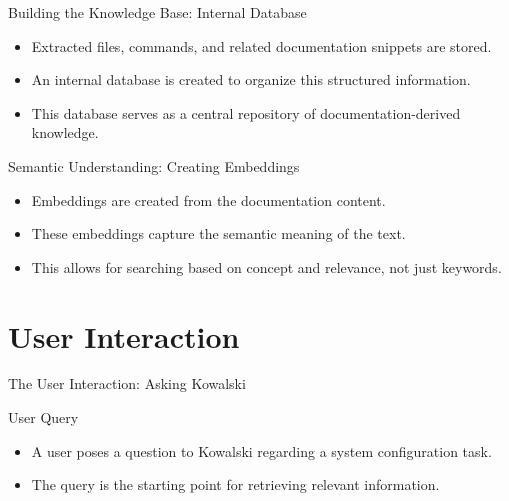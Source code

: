 \documentclass[aspectratio=169]{beamer}
\begin{document}
\begin{frame}{Building the Knowledge Base: Internal Database}
  \begin{itemize}
    \item Extracted files, commands, and related documentation snippets are stored.
    \item An internal database is created to organize this structured information.
    \item This database serves as a central repository of documentation-derived knowledge.
  \end{itemize}
\end{frame}

\begin{frame}{Semantic Understanding: Creating Embeddings}
  \begin{itemize}
    \item Embeddings are created from the documentation content.
    \item These embeddings capture the semantic meaning of the text.
    \item This allows for searching based on concept and relevance, not just keywords.
  \end{itemize}
\end{frame}

\section{User Interaction}
\begin{frame}{The User Interaction: Asking Kowalski}
  \begin{block}{User Query}
    \begin{itemize}
      \item A user poses a question to Kowalski regarding a system configuration task.
      \item The query is the starting point for retrieving relevant information.
    \end{itemize}
  \end{block}
\end{frame}
\end{document}
